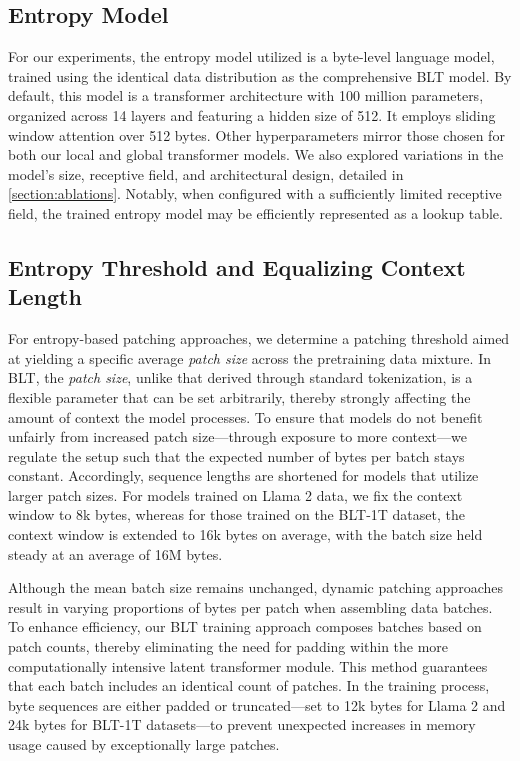 \subsection{Entropy Model}  
For our experiments, the entropy model utilized is a byte-level language model, trained using the identical data distribution as the comprehensive {\textsc BLT} model. By default, this model is a transformer architecture with 100 million parameters, organized across 14 layers and featuring a hidden size of 512. It employs sliding window attention over 512 bytes. Other hyperparameters mirror those chosen for both our local and global transformer models. We also explored variations in the model's size, receptive field, and architectural design, detailed in \autoref{section:ablations}. Notably, when configured with a sufficiently limited receptive field, the trained entropy model may be efficiently represented as a lookup table.

\subsection{Entropy Threshold and Equalizing Context Length} For entropy-based patching approaches, we determine a patching threshold aimed at yielding a specific average \textit{patch size} across the pretraining data mixture. In {\textsc BLT}, the \textit{patch size}, unlike that derived through standard tokenization, is a flexible parameter that can be set arbitrarily, thereby strongly affecting the amount of context the model processes. To ensure that models do not benefit unfairly from increased patch size—through exposure to more context—we regulate the setup such that the expected number of bytes per batch stays constant. Accordingly, sequence lengths are shortened for models that utilize larger patch sizes. For models trained on Llama 2 data, we fix the context window to 8k bytes, whereas for those trained on the {\textsc BLT}-1T dataset, the context window is extended to 16k bytes on average, with the batch size held steady at an average of 16M bytes.

Although the mean batch size remains unchanged, dynamic patching approaches result in varying proportions of bytes per patch when assembling data batches. To enhance efficiency, our {\textsc BLT} training approach composes batches based on patch counts, thereby eliminating the need for padding within the more computationally intensive latent transformer module. This method guarantees that each batch includes an identical count of patches. In the training process, byte sequences are either padded or truncated—set to 12k bytes for Llama 2 and 24k bytes for {\textsc BLT}-1T datasets—to prevent unexpected increases in memory usage caused by exceptionally large patches.

